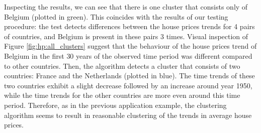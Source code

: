 \documentclass[a4paper,12pt]{article}
\begin{document}
{Inspecting the results, we can see that there is one cluster that consists only of Belgium (plotted in green). This coincides with the results of our testing procedure: the test detects differences between the house prices trends for 4 pairs of countries, and Belgium is present in these pairs 3 times. Visual inspection of Figure \ref{fig:hp:all_clusters} suggest that the behaviour of the house prices trend of Belgium in the first $30$ years of the observed time period was different compared to other countries. Then, the algorithm detects a cluster that consists of two countries: France and the Netherlands (plotted in blue). The time trends of these two countries exhibit a slight decrease followed by an increase around year 1950, while the time trends for the other countries are more even around this time period. Therefore, as in the previous application example, the clustering algorithm seems to result in reasonable clustering of the trends in average house prices.}



\end{document}
